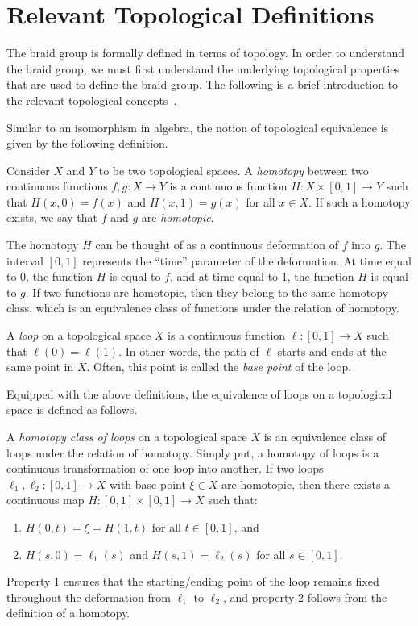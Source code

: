 \chapter{Relevant Topological Definitions}\label{ch:top_background}

The braid group is formally defined in terms of topology. In order to understand the braid group, we must first understand the underlying topological properties that are used to define the braid group. The following is a brief introduction to the relevant topological concepts~\cite{Fulton1997,Kassel2008}.

Similar to an isomorphism in algebra, the notion of topological equivalence is given by the following definition.
\begin{definition}
    Consider $X$ and $Y$ to be two topological spaces. A \textit{homotopy} between two continuous functions $f,g:X\to Y$ is a continuous function $H:X\times[0,1]\to Y$ such that $H(x,0)=f(x)$ and $H(x,1)=g(x)$ for all $x\in X$. If such a homotopy exists, we say that $f$ and $g$ are \textit{homotopic}.
\end{definition}
The homotopy $H$ can be thought of as a continuous deformation of $f$ into $g$. The interval $\left[ 0,1 \right]$ represents the ``time'' parameter of the deformation. At time equal to 0, the function $H$ is equal to $f$, and at time equal to 1, the function $H$ is equal to $g$. If two functions are homotopic, then they belong to the same homotopy class, which is an equivalence class of functions under the relation of homotopy.

\begin{definition}
    A \textit{loop} on a topological space $X$ is a continuous function $\ell:[0,1]\to X$ such that $\ell(0) = \ell(1)$. In other words, the path of $\ell$ starts and ends at the same point in $X$. Often, this point is called the \textit{base point} of the loop.
\end{definition}

Equipped with the above definitions, the equivalence of loops on a topological space is defined as follows.
\begin{definition}
    A \textit{homotopy class of loops} on a topological space $X$ is an equivalence class of loops under the relation of homotopy. Simply put, a homotopy of loops is a continuous transformation of one loop into another. If two loops $\ell_1,\ell_2:[0,1]\to X$ with base point $\xi\in X$ are homotopic, then there exists a continuous map $H:[0,1]\times [0,1]\to X$ such that:
    \begin{enumerate}
        \item $H(0,t) = \xi = H(1,t)$ for all $t\in [0,1]$, and
        \item $H(s,0) = \ell_1(s)$ and $H(s,1) = \ell_2(s)$ for all $s\in [0,1]$.
    \end{enumerate}
    Property 1 ensures that the starting/ending point of the loop remains fixed throughout the deformation from $\ell_1$ to $\ell_2$, and property 2 follows from the definition of a homotopy.
\end{definition}

